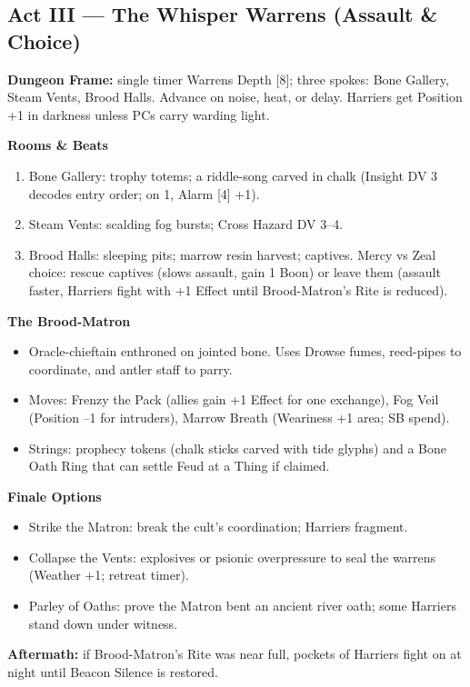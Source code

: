 \documentclass[11pt]{article}
\begin{document}
\subsection{Act III --- The Whisper Warrens (Assault \& Choice)}

\textbf{Dungeon Frame:} single timer Warrens Depth [8]; three spokes: Bone Gallery, Steam Vents, Brood Halls. Advance on noise, heat, or delay. Harriers get Position +1 in darkness unless PCs carry warding light.

\textbf{Rooms \& Beats}
\begin{enumerate}
\item Bone Gallery: trophy totems; a riddle-song carved in chalk (Insight DV 3 decodes entry order; on 1, Alarm [4] +1).
\item Steam Vents: scalding fog bursts; Cross Hazard DV 3--4.
\item Brood Halls: sleeping pits; marrow resin harvest; captives. Mercy vs Zeal choice: rescue captives (slows assault, gain 1 Boon) or leave them (assault faster, Harriers fight with +1 Effect until Brood-Matron's Rite is reduced).
\end{enumerate}

\textbf{The Brood-Matron}
\begin{itemize}
\item Oracle-chieftain enthroned on jointed bone. Uses Drowse fumes, reed-pipes to coordinate, and antler staff to parry.
\item Moves: Frenzy the Pack (allies gain +1 Effect for one exchange), Fog Veil (Position --1 for intruders), Marrow Breath (Weariness +1 area; SB spend).
\item Strings: prophecy tokens (chalk sticks carved with tide glyphs) and a Bone Oath Ring that can settle Feud at a Thing if claimed.
\end{itemize}

\textbf{Finale Options}
\begin{itemize}
\item Strike the Matron: break the cult's coordination; Harriers fragment.
\item Collapse the Vents: explosives or psionic overpressure to seal the warrens (Weather +1; retreat timer).
\item Parley of Oaths: prove the Matron bent an ancient river oath; some Harriers stand down under witness.
\end{itemize}

\textbf{Aftermath:} if Brood-Matron's Rite was near full, pockets of Harriers fight on at night until Beacon Silence is restored.
\end{document}
